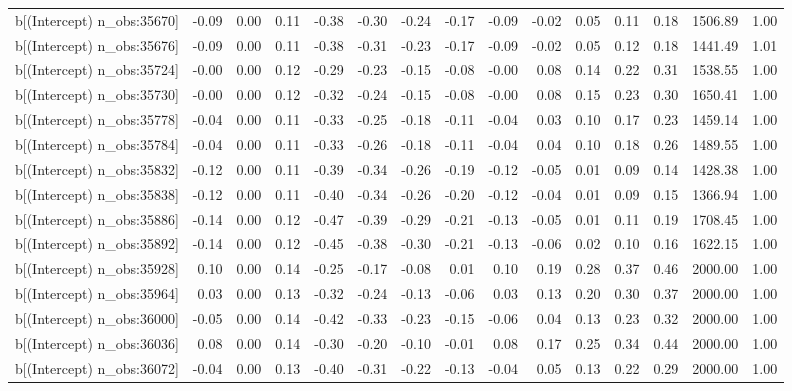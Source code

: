 \begin{table}[ht]
\begin{tabular}{rrrrrrrrrrrrrrr}
  b[(Intercept) n\_obs:35670] & -0.09 & 0.00 & 0.11 & -0.38 & -0.30 & -0.24 & -0.17 & -0.09 & -0.02 & 0.05 & 0.11 & 0.18 & 1506.89 & 1.00 \\ 
  b[(Intercept) n\_obs:35676] & -0.09 & 0.00 & 0.11 & -0.38 & -0.31 & -0.23 & -0.17 & -0.09 & -0.02 & 0.05 & 0.12 & 0.18 & 1441.49 & 1.01 \\ 
  b[(Intercept) n\_obs:35724] & -0.00 & 0.00 & 0.12 & -0.29 & -0.23 & -0.15 & -0.08 & -0.00 & 0.08 & 0.14 & 0.22 & 0.31 & 1538.55 & 1.00 \\ 
  b[(Intercept) n\_obs:35730] & -0.00 & 0.00 & 0.12 & -0.32 & -0.24 & -0.15 & -0.08 & -0.00 & 0.08 & 0.15 & 0.23 & 0.30 & 1650.41 & 1.00 \\ 
  b[(Intercept) n\_obs:35778] & -0.04 & 0.00 & 0.11 & -0.33 & -0.25 & -0.18 & -0.11 & -0.04 & 0.03 & 0.10 & 0.17 & 0.23 & 1459.14 & 1.00 \\ 
  b[(Intercept) n\_obs:35784] & -0.04 & 0.00 & 0.11 & -0.33 & -0.26 & -0.18 & -0.11 & -0.04 & 0.04 & 0.10 & 0.18 & 0.26 & 1489.55 & 1.00 \\ 
  b[(Intercept) n\_obs:35832] & -0.12 & 0.00 & 0.11 & -0.39 & -0.34 & -0.26 & -0.19 & -0.12 & -0.05 & 0.01 & 0.09 & 0.14 & 1428.38 & 1.00 \\ 
  b[(Intercept) n\_obs:35838] & -0.12 & 0.00 & 0.11 & -0.40 & -0.34 & -0.26 & -0.20 & -0.12 & -0.04 & 0.01 & 0.09 & 0.15 & 1366.94 & 1.00 \\ 
  b[(Intercept) n\_obs:35886] & -0.14 & 0.00 & 0.12 & -0.47 & -0.39 & -0.29 & -0.21 & -0.13 & -0.05 & 0.01 & 0.11 & 0.19 & 1708.45 & 1.00 \\ 
  b[(Intercept) n\_obs:35892] & -0.14 & 0.00 & 0.12 & -0.45 & -0.38 & -0.30 & -0.21 & -0.13 & -0.06 & 0.02 & 0.10 & 0.16 & 1622.15 & 1.00 \\ 
  b[(Intercept) n\_obs:35928] & 0.10 & 0.00 & 0.14 & -0.25 & -0.17 & -0.08 & 0.01 & 0.10 & 0.19 & 0.28 & 0.37 & 0.46 & 2000.00 & 1.00 \\ 
  b[(Intercept) n\_obs:35964] & 0.03 & 0.00 & 0.13 & -0.32 & -0.24 & -0.13 & -0.06 & 0.03 & 0.13 & 0.20 & 0.30 & 0.37 & 2000.00 & 1.00 \\ 
  b[(Intercept) n\_obs:36000] & -0.05 & 0.00 & 0.14 & -0.42 & -0.33 & -0.23 & -0.15 & -0.06 & 0.04 & 0.13 & 0.23 & 0.32 & 2000.00 & 1.00 \\ 
  b[(Intercept) n\_obs:36036] & 0.08 & 0.00 & 0.14 & -0.30 & -0.20 & -0.10 & -0.01 & 0.08 & 0.17 & 0.25 & 0.34 & 0.44 & 2000.00 & 1.00 \\ 
  b[(Intercept) n\_obs:36072] & -0.04 & 0.00 & 0.13 & -0.40 & -0.31 & -0.22 & -0.13 & -0.04 & 0.05 & 0.13 & 0.22 & 0.29 & 2000.00 & 1.00 \\ 

\end{tabular}
\end{table}
